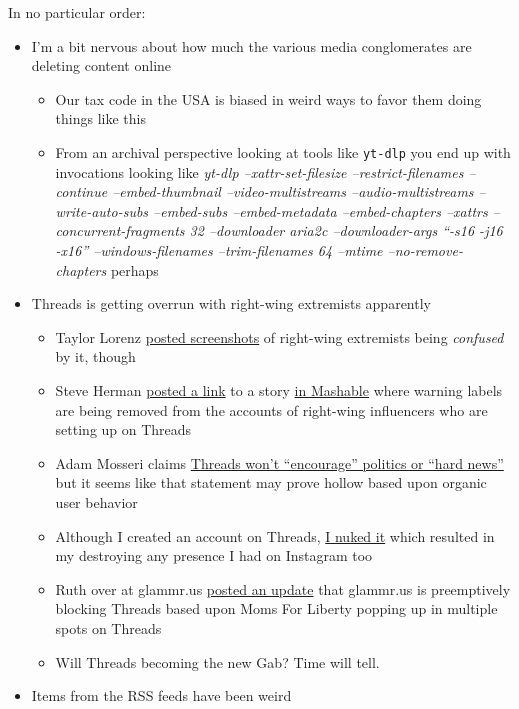 In no particular order:

\begin{itemize}
\tightlist
\item
  I'm a bit nervous about how much the various media conglomerates are
  deleting content online

  \begin{itemize}
  \tightlist
  \item
    Our tax code in the USA is biased in weird ways to favor them doing
    things like this
  \item
    From an archival perspective looking at tools like \texttt{yt-dlp}
    you end up with invocations looking like \emph{yt-dlp
    --xattr-set-filesize --restrict-filenames --continue
    --embed-thumbnail --video-multistreams --audio-multistreams
    --write-auto-subs --embed-subs --embed-metadata --embed-chapters
    --xattrs --concurrent-fragments 32 --downloader aria2c
    --downloader-args ``-s16 -j16 -x16'' --windows-filenames
    --trim-filenames 64 --mtime --no-remove-chapters} perhaps
  \end{itemize}
\item
  Threads is getting overrun with right-wing extremists apparently

  \begin{itemize}
  \tightlist
  \item
    Taylor Lorenz
    \href{https://mastodon.social/@taylorlorenz/110675339989968302}{posted
    screenshots} of right-wing extremists being \emph{confused} by it,
    though
  \item
    Steve Herman
    \href{https://journa.host/@w7voa/110674927731088308}{posted a link}
    to a story
    \href{https://mashable.com/article/threads-false-information-label-donald-trump-jr-error}{in
    Mashable} where warning labels are being removed from the accounts
    of right-wing influencers who are setting up on Threads
  \item
    Adam Mosseri claims
    \href{https://techhub.social/@Techmeme/110674284274327762}{Threads
    won't ``encourage'' politics or ``hard news''} but it seems like
    that statement may prove hollow based upon organic user behavior
  \item
    Although I created an account on Threads,
    \href{https://ubuntu.social/@alpacaherder/110674058853084466}{I
    nuked it} which resulted in my destroying any presence I had on
    Instagram too
  \item
    Ruth over at glammr.us
    \href{https://glammr.us/@platypus/110672719513626758}{posted an
    update} that glammr.us is preemptively blocking Threads based upon
    Moms For Liberty popping up in multiple spots on Threads
  \item
    Will Threads becoming the new Gab? Time will tell.
  \end{itemize}
\item
  Items from the RSS feeds have been weird


\end{itemize}
